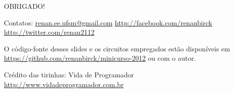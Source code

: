 \documentclass{beamer}
\begin{document}
\begin{frame}
{\LARGE OBRIGADO!}
\end{frame}

\begin{frame}
Contatos: \url{renan.ee.ufsm@gmail.com} \url{http://facebook.com/renanbirck} \url{http://twitter.com/renan2112}\newline

O código-fonte desses slides e os circuitos empregados estão disponíveis em \url{https://github.com/renanbirck/minicurso-2012} ou com o autor.

Crédito das tirinhas: Vida de Programador \url{http://www.vidadeprogramador.com.br}
\end{frame}
\end{document}
